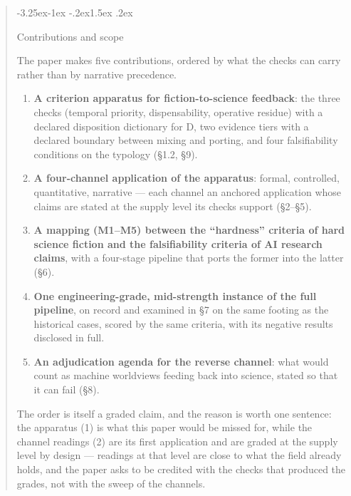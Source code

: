 \documentclass[11pt,a4paper]{article}
\makeatletter
\renewcommand\subsection{\@startsection{subsection}{2}{\z@}%
  {-3.25ex\@plus -1ex \@minus -.2ex}{1.5ex \@plus .2ex}%
  {\normalfont\large\bfseries\raggedright}}
\makeatother
\begin{document}
\begin{abstract}
\subsection{Contributions and scope}

The paper makes five contributions, ordered by what the checks can carry rather than by narrative precedence.

\begin{enumerate}[leftmargin=1.6em,itemsep=2pt,parsep=0pt,topsep=3pt]
\item \textbf{A criterion apparatus for fiction-to-science feedback}: the three checks (temporal priority, dispensability, operative residue) with a declared disposition dictionary for D, two evidence tiers with a declared boundary between mixing and porting, and four falsifiability conditions on the typology (§1.2, §9).
\item \textbf{A four-channel application of the apparatus}: formal, controlled, quantitative, narrative — each channel an anchored application whose claims are stated at the supply level its checks support (§2–§5).
\item \textbf{A mapping (M1–M5) between the ``hardness'' criteria of hard science fiction and the falsifiability criteria of AI research claims}, with a four-stage pipeline that ports the former into the latter (§6).
\item \textbf{One engineering-grade, mid-strength instance of the full pipeline}, on record and examined in §7 on the same footing as the historical cases, scored by the same criteria, with its negative results disclosed in full.
\item \textbf{An adjudication agenda for the reverse channel}: what would count as machine worldviews feeding back into science, stated so that it can fail (§8).
\end{enumerate}

The order is itself a graded claim, and the reason is worth one sentence: the apparatus (1) is what this paper would be missed for, while the channel readings (2) are its first application and are graded at the supply level by design — readings at that level are close to what the field already holds, and the paper asks to be credited with the checks that produced the grades, not with the sweep of the channels.


\end{abstract}
\end{document}
